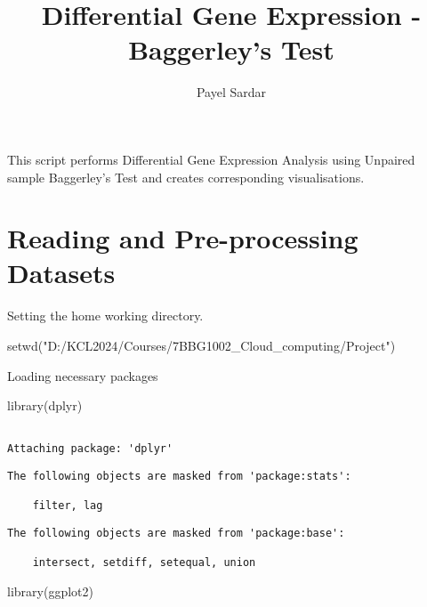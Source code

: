 \documentclass[
  letterpaper,
  DIV=11,
  numbers=noendperiod]{scrartcl}
\title{Differential Gene Expression - Baggerley's Test}
\author{Payel Sardar}
\date{}
\newenvironment{Shaded}{\begin{snugshade}}{\end{snugshade}}
\newcommand{\FunctionTok}[1]{\textcolor[rgb]{0.28,0.35,0.67}{#1}}
\newcommand{\NormalTok}[1]{\textcolor[rgb]{0.00,0.23,0.31}{#1}}
\newcommand{\StringTok}[1]{\textcolor[rgb]{0.13,0.47,0.30}{#1}}
\begin{document}
\maketitle


This script performs Differential Gene Expression Analysis using
Unpaired sample Baggerley's Test and creates corresponding
visualisations.

\section{Reading and Pre-processing
Datasets}\label{reading-and-pre-processing-datasets}

Setting the home working directory.

\begin{Shaded}
\begin{Highlighting}[]
\FunctionTok{setwd}\NormalTok{(}\StringTok{"D:/KCL2024/Courses/7BBG1002\_Cloud\_computing/Project"}\NormalTok{)}
\end{Highlighting}
\end{Shaded}

Loading necessary packages

\begin{Shaded}
\begin{Highlighting}[]
\FunctionTok{library}\NormalTok{(dplyr)}
\end{Highlighting}
\end{Shaded}

\begin{verbatim}

Attaching package: 'dplyr'
\end{verbatim}

\begin{verbatim}
The following objects are masked from 'package:stats':

    filter, lag
\end{verbatim}

\begin{verbatim}
The following objects are masked from 'package:base':

    intersect, setdiff, setequal, union
\end{verbatim}

\begin{Shaded}
\begin{Highlighting}[]
\FunctionTok{library}\NormalTok{(ggplot2)}
\end{Highlighting}
\end{Shaded}
\end{document}
